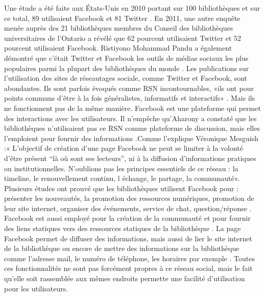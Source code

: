 \documentclass[a4paper,11pt]{article} %
\begin{document}
Une étude a été faite aux États-Unis en 2010 portant sur 100 bibliothèques et sur ce total, 89 utilisaient Facebook et 81 Twitter \citep{palmer2014caractérisant,}. En 2011, une autre enquête menée auprès des 21 bibliothèques membres du Conseil des bibliothèques universitaires de l'Ontario a révélé que 62 pourcent utilisaient Twitter et 52 pourcent utilisaient Facebook. \citep{collins2012social,} Ristiyono Mohammad Pandu a également démontré que c’était Twitter et Facebook les outils de médias sociaux les plus populaires parmi la plupart des bibliothèques du monde \citep{ristiyono2021effectiveness,}. Les publications sur l’utilisation des sites de réseautages sociale, comme Twitter et Facebook, sont abondantes. Ils sont parfois évoqués comme RSN incontournables, «ils ont pour points communs d’être à la fois généralistes, informatifs et interactifs» \citep{mesguich2017bibliotheques,}. Mais ils ne fonctionnent pas de la même manière. Facebook est une plateforme qui permet des interactions avec les utilisateurs. Il n’empêche qu’Aharony a constaté que les bibliothèques n’utilisaient pas ce RSN comme plateforme de discussion, mais elles l’emploient pour fournir des informations \citep{aharony2012facebook,}.Comme l’explique Véronique Mesguish :« L’objectif de création d’une page Facebook ne peut se limiter à la volonté d’être présent “là où sont ses lecteurs”, ni à la diffusion d’informations pratiques ou institutionnelles. N’oublions pas les principes essentiels de ce réseau : la timeline, le renouvellement continu, l échange, le partage, la communauté». \citep{mesguich2017bibliotheques,}
\\Plusieurs études ont prouvé que les bibliothèques utilisent Facebook pour : présenter les nouveautés, la promotion des ressources numériques, promotion de leur site internet, organiser des événements, service de chat, question/réponse \citep{deaudureau,}. Facebook est aussi employé pour la création de la communauté et pour fournir des liens statiques vers des ressources statiques de la bibliothèque \citep{palmer2014characterizing,}. La page Facebook permet de diffuser des informations, mais aussi de lier le site internet de la bibliothèque ou encore de mettre des informations sur la bibliothèque comme l’adresse mail, le numéro de téléphone, les horaires par exemple \citep{fernandez2016redes,}. Toutes ces fonctionnalités ne sont pas forcément propres à ce réseau social, mais le fait qu’elle soit rassemblée aux mêmes 
endroits permette une facilité d’utilisation pour les utilisateurs. \citep{stylianou2015review,}
\end{document}
